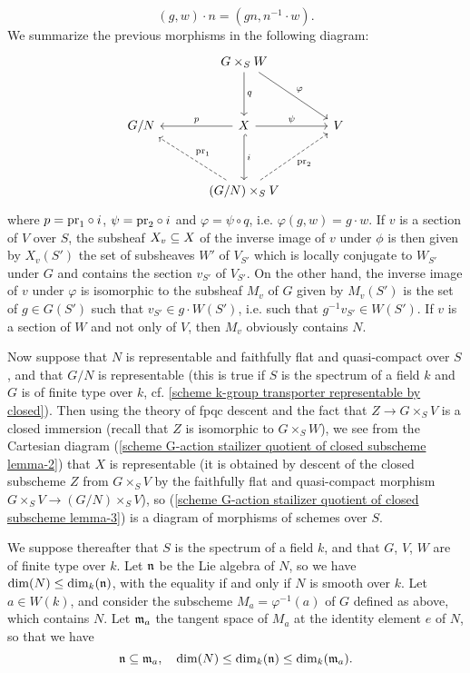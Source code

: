 \[(g,w)\cdot n=(gn,n^{-1}\cdot w).\]
We summarize the previous morphisms in the following diagram:
\begin{equation}\label{scheme G-action stailizer quotient of closed subscheme lemma-3}
\begin{tikzcd}[row sep=12mm, column sep=12mm]
&G\times_SW\ar[rd,"\varphi"]\ar[d,"q"]&\\
G/N&X\ar[d,hook,"i"]\ar[r,"\psi"]\ar[l,swap,"p"]&V\\
&(G/N)\times_SV\ar[ru,dashed,swap,"\pr_2"]\ar[lu,dashed,swap,"\pr_1"]&
\end{tikzcd}
\end{equation}
where $p=\mathrm{pr}_1\circ i$, $\psi=\mathrm{pr}_2\circ i$ and $\varphi=\psi\circ q$, i.e. $\varphi(g,w)=g\cdot w$. If $v$ is a section of $V$ over $S$, the subsheaf $X_v\subseteq X$ of the inverse image of $v$ under $\phi$ is then given by $X_v(S')$ the set of subsheaves $W'$ of $V_{S'}$ which is locally conjugate to $W_{S'}$ under $G$ and contains the section $v_{S'}$ of $V_{S'}$. On the other hand, the inverse image of $v$ under $\varphi$ is isomorphic to the subsheaf $M_v$ of $G$ given by $M_v(S')$ is the set of $g\in G(S')$ such that $v_{S'}\in g\cdot W(S')$, i.e. such that $g^{-1}v_{S'}\in W(S')$. If $v$ is a section of $W$ and not only of $V$, then $M_v$ obviously contains $N$.\par
Now suppose that $N$ is representable and faithfully flat and quasi-compact over $S$, and that $G/N$ is representable (this is true if $S$ is the spectrum of a field $k$ and $G$ is of finite type over $k$, cf. \cref{scheme k-group transporter representable by closed}). Then using the theory of fpqc descent and the fact that $Z\to G\times_SV$ is a closed immersion (recall that $Z$ is isomorphic to $G\times_SW$), we see from the Cartesian diagram (\ref{scheme G-action stailizer quotient of closed subscheme lemma-2}) that $X$ is representable (it is obtained by descent of the closed subscheme $Z$ from $G\times_SV$ by the faithfully flat and quasi-compact morphism $G\times_SV\to (G/N)\times_SV$), so (\ref{scheme G-action stailizer quotient of closed subscheme lemma-3}) is a diagram of morphisms of schemes over $S$.\par
We suppose thereafter that $S$ is the spectrum of a field $k$, and that $G$, $V$, $W$ are of finite type over $k$. Let $\mathfrak{n}$ be the Lie algebra of $N$, so we have $\dim(N)\leq\dim_k(\mathfrak{n})$, with the equality if and only if $N$ is smooth over $k$. Let $a\in W(k)$, and consider the subscheme $M_a=\varphi^{-1}(a)$ of $G$ defined as above, which contains $N$. Let $\mathfrak{m}_a$ the tangent space of $M_a$ at the identity element $e$ of $N$, so that we have 
\begin{equation}\label{scheme action normalizer and inverse image prop-1}
\mathfrak{n}\subseteq\mathfrak{m}_a,\quad \dim(N)\leq\dim_k(\mathfrak{n})\leq\dim_k(\mathfrak{m}_a).
\end{equation}

